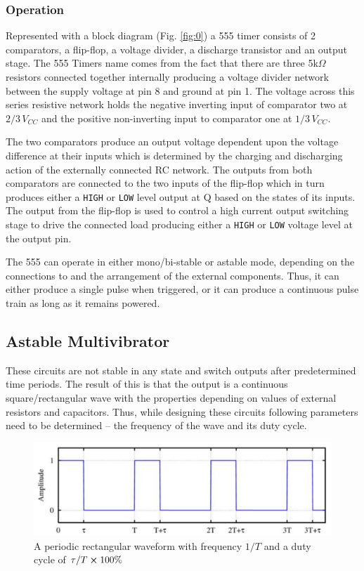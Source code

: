 \subsubsection*{Operation}

Represented with a block diagram (Fig. \ref{fig:0}) a 555 timer consists of 2 comparators, a flip-flop, a
voltage divider, a discharge transistor and an output stage. The 555 Timers name comes from the fact that there are three 5k$\Omega$ resistors connected together internally producing a voltage divider network between the supply voltage at pin 8 and ground at pin 1. The voltage across this series resistive network holds the negative inverting input of comparator two at $2/3\,V_{CC}$ and the positive non-inverting input to comparator one at $1/3\,V_{CC}$.

The two comparators produce an output voltage dependent upon the voltage difference at their inputs which is determined by the charging and discharging action of the externally connected RC network. The outputs from both comparators are connected to the two inputs of the flip-flop which in turn produces either a \verb|HIGH| or \verb|LOW| level output at Q based on the states of its inputs. The output from the flip-flop is used to control a high current output switching stage to drive the connected load producing either a \verb|HIGH| or \verb|LOW| voltage level at the output pin.

The 555 can operate in either mono/bi-stable or astable mode, depending on the
connections to and the arrangement of the external components. Thus, it can either
produce a single pulse when triggered, or it can produce a continuous pulse train as long
as it remains powered.

\subsection{Astable Multivibrator}
These circuits are not stable in any state and switch outputs after predetermined time
periods. The result of this is that the output is a continuous square/rectangular wave with
the properties depending on values of external resistors and capacitors. Thus, while
designing these circuits following parameters need to be determined -- the frequency of the wave and its duty cycle.

\begin{figure}[H]
    \centering
    \includegraphics[width=1\columnwidth]{images/rect.png}
    \caption{A periodic rectangular waveform with frequency $1/T$ and a duty cycle of $\tau/T \cross 100\%$}
    \label{rect}
\end{figure}

